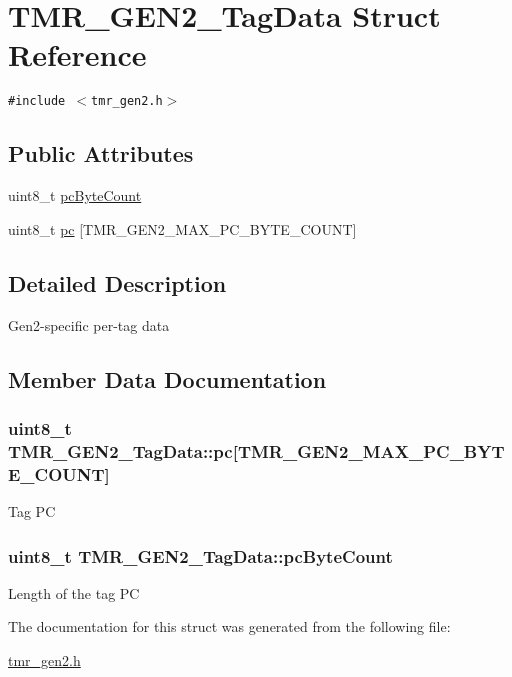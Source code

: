\hypertarget{struct_t_m_r___g_e_n2___tag_data}{
\section{TMR\_\-GEN2\_\-TagData Struct Reference}
\label{struct_t_m_r___g_e_n2___tag_data}
}
{\tt \#include $<$tmr\_\-gen2.h$>$}

\subsection*{Public Attributes}
\begin{CompactItemize}
\item 
uint8\_\-t \hyperlink{struct_t_m_r___g_e_n2___tag_data_150da455eb005a51b46ffa38440466c0}{pcByteCount}
\item 
uint8\_\-t \hyperlink{struct_t_m_r___g_e_n2___tag_data_282734a6143d33bd5bad1196430b065c}{pc} \mbox{[}TMR\_\-GEN2\_\-MAX\_\-PC\_\-BYTE\_\-COUNT\mbox{]}
\end{CompactItemize}


\subsection{Detailed Description}
Gen2-specific per-tag data 

\subsection{Member Data Documentation}
\hypertarget{struct_t_m_r___g_e_n2___tag_data_282734a6143d33bd5bad1196430b065c}{
\subsubsection[{pc}]{\setlength{\rightskip}{0pt plus 5cm}uint8\_\-t {\bf TMR\_\-GEN2\_\-TagData::pc}\mbox{[}TMR\_\-GEN2\_\-MAX\_\-PC\_\-BYTE\_\-COUNT\mbox{]}}}
\label{struct_t_m_r___g_e_n2___tag_data_282734a6143d33bd5bad1196430b065c}


Tag PC \hypertarget{struct_t_m_r___g_e_n2___tag_data_150da455eb005a51b46ffa38440466c0}{
\subsubsection[{pcByteCount}]{\setlength{\rightskip}{0pt plus 5cm}uint8\_\-t {\bf TMR\_\-GEN2\_\-TagData::pcByteCount}}}
\label{struct_t_m_r___g_e_n2___tag_data_150da455eb005a51b46ffa38440466c0}


Length of the tag PC 

The documentation for this struct was generated from the following file:\begin{CompactItemize}
\item 
\hyperlink{tmr__gen2_8h}{tmr\_\-gen2.h}\end{CompactItemize}
